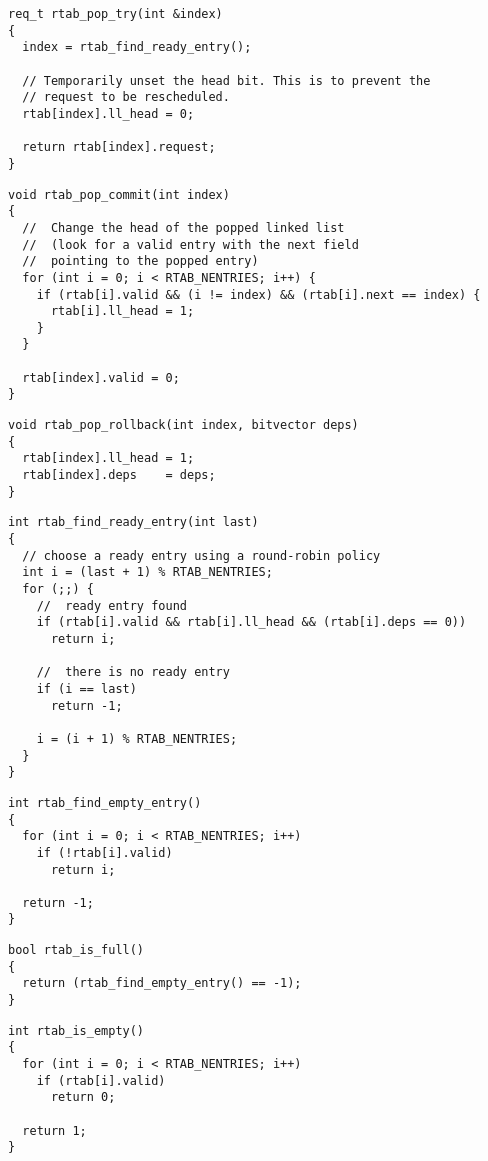 \documentclass[10pt,titlepage,twoside]{book}
\begin{document}
\begin{lstlisting}
req_t rtab_pop_try(int &index)
{
  index = rtab_find_ready_entry();

  // Temporarily unset the head bit. This is to prevent the
  // request to be rescheduled.
  rtab[index].ll_head = 0;

  return rtab[index].request;
}
\end{lstlisting}

\begin{lstlisting}
void rtab_pop_commit(int index)
{
  //  Change the head of the popped linked list
  //  (look for a valid entry with the next field
  //  pointing to the popped entry)
  for (int i = 0; i < RTAB_NENTRIES; i++) {
    if (rtab[i].valid && (i != index) && (rtab[i].next == index) {
      rtab[i].ll_head = 1;
    }
  }

  rtab[index].valid = 0;
}
\end{lstlisting}

\begin{lstlisting}
void rtab_pop_rollback(int index, bitvector deps)
{
  rtab[index].ll_head = 1;
  rtab[index].deps    = deps;
}
\end{lstlisting}

\begin{lstlisting}
int rtab_find_ready_entry(int last)
{
  // choose a ready entry using a round-robin policy
  int i = (last + 1) % RTAB_NENTRIES;
  for (;;) {
    //  ready entry found
    if (rtab[i].valid && rtab[i].ll_head && (rtab[i].deps == 0))
      return i;

    //  there is no ready entry
    if (i == last)
      return -1;

    i = (i + 1) % RTAB_NENTRIES;
  }
}
\end{lstlisting}

\begin{lstlisting}
int rtab_find_empty_entry()
{
  for (int i = 0; i < RTAB_NENTRIES; i++)
    if (!rtab[i].valid)
      return i;

  return -1;
}
\end{lstlisting}

\begin{lstlisting}
bool rtab_is_full()
{
  return (rtab_find_empty_entry() == -1);
}
\end{lstlisting}

\begin{lstlisting}
int rtab_is_empty()
{
  for (int i = 0; i < RTAB_NENTRIES; i++)
    if (rtab[i].valid)
      return 0;

  return 1;
}
\end{lstlisting}
\end{document}
